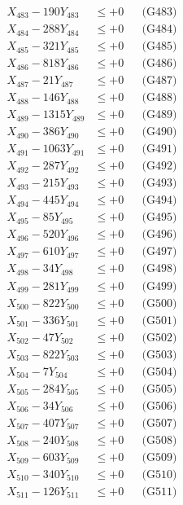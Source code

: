 \documentclass[a4paper,10pt]{article}
\begin{document}
{\begin{align}
X_{483} - 190Y_{483} &\leq +0 && \text{(G483)} \\
X_{484} - 288Y_{484} &\leq +0 && \text{(G484)} \\
X_{485} - 321Y_{485} &\leq +0 && \text{(G485)} \\
X_{486} - 818Y_{486} &\leq +0 && \text{(G486)} \\
X_{487} - 21Y_{487} &\leq +0 && \text{(G487)} \\
X_{488} - 146Y_{488} &\leq +0 && \text{(G488)} \\
X_{489} - 1315Y_{489} &\leq +0 && \text{(G489)} \\
X_{490} - 386Y_{490} &\leq +0 && \text{(G490)} \\
\allowbreak
X_{491} - 1063Y_{491} &\leq +0 && \text{(G491)} \\
X_{492} - 287Y_{492} &\leq +0 && \text{(G492)} \\
X_{493} - 215Y_{493} &\leq +0 && \text{(G493)} \\
X_{494} - 445Y_{494} &\leq +0 && \text{(G494)} \\
X_{495} - 85Y_{495} &\leq +0 && \text{(G495)} \\
X_{496} - 520Y_{496} &\leq +0 && \text{(G496)} \\
X_{497} - 610Y_{497} &\leq +0 && \text{(G497)} \\
X_{498} - 34Y_{498} &\leq +0 && \text{(G498)} \\
X_{499} - 281Y_{499} &\leq +0 && \text{(G499)} \\
X_{500} - 822Y_{500} &\leq +0 && \text{(G500)} \\
\allowbreak
X_{501} - 336Y_{501} &\leq +0 && \text{(G501)} \\
X_{502} - 47Y_{502} &\leq +0 && \text{(G502)} \\
X_{503} - 822Y_{503} &\leq +0 && \text{(G503)} \\
X_{504} - 7Y_{504} &\leq +0 && \text{(G504)} \\
X_{505} - 284Y_{505} &\leq +0 && \text{(G505)} \\
X_{506} - 34Y_{506} &\leq +0 && \text{(G506)} \\
X_{507} - 407Y_{507} &\leq +0 && \text{(G507)} \\
X_{508} - 240Y_{508} &\leq +0 && \text{(G508)} \\
X_{509} - 603Y_{509} &\leq +0 && \text{(G509)} \\
X_{510} - 340Y_{510} &\leq +0 && \text{(G510)} \\
\allowbreak
X_{511} - 126Y_{511} &\leq +0 && \text{(G511)} \\

\end{align}}
\end{document}
